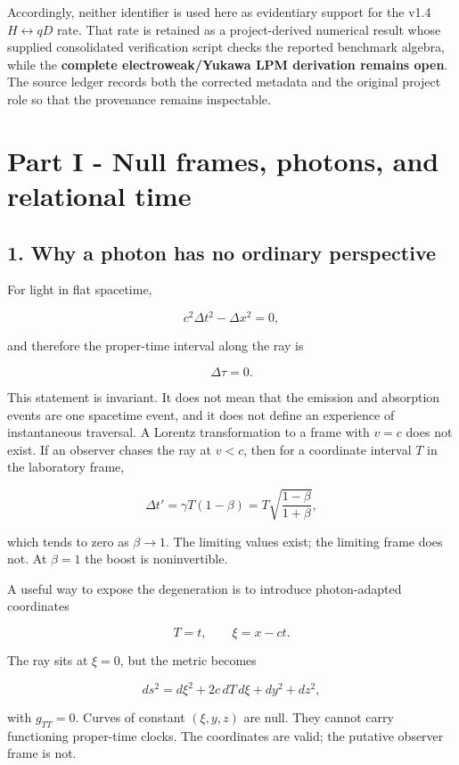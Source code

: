 \documentclass[
]{article}
\begin{document}
Accordingly, neither identifier is used here as evidentiary support for
the v1.4 \(H\leftrightarrow qD\) rate. That rate is retained as a
project-derived numerical result whose supplied consolidated
verification script checks the reported benchmark algebra, while the
\textbf{complete electroweak/Yukawa LPM derivation remains open}. The
source ledger records both the corrected metadata and the original
project role so that the provenance remains inspectable.

\section{Part I - Null frames, photons, and relational
time}\label{part-i---null-frames-photons-and-relational-time}

\subsection{1. Why a photon has no ordinary
perspective}\label{why-a-photon-has-no-ordinary-perspective}

For light in flat spacetime,

\[
c^2\Delta t^2-\Delta x^2=0,
\]

and therefore the proper-time interval along the ray is

\[
\Delta\tau=0.
\]

This statement is invariant. It does not mean that the emission and
absorption events are one spacetime event, and it does not define an
experience of instantaneous traversal. A Lorentz transformation to a
frame with \(v=c\) does not exist. If an observer chases the ray at
\(v<c\), then for a coordinate interval \(T\) in the laboratory frame,

\[
\Delta t'
=\gamma T(1-\beta)
=T\sqrt{\frac{1-\beta}{1+\beta}},
\]

which tends to zero as \(\beta\rightarrow1\). The limiting values exist;
the limiting frame does not. At \(\beta=1\) the boost is noninvertible.

A useful way to expose the degeneration is to introduce photon-adapted
coordinates

\[
T=t,
\qquad
\xi=x-ct.
\]

The ray sits at \(\xi=0\), but the metric becomes

\[
 ds^2=d\xi^2+2c\,dT\,d\xi+dy^2+dz^2,
\]

with \(g_{TT}=0\). Curves of constant \((\xi,y,z)\) are null. They
cannot carry functioning proper-time clocks. The coordinates are valid;
the putative observer frame is not.
\end{document}
